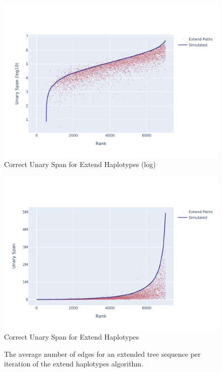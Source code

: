 \documentclass[10pt,twoside,lineno]{gsajnl}
\begin{document}
\begin{figure}[bht]
	\includegraphics[width=0.9\linewidth]{newplots_wo_ee/better_unary_spans_ep_log.pdf}
	\caption{Correct Unary Span for Extend Haplotypes (log)}
	\label{fig:correct-unary-span-log}
\end{figure}

\begin{figure}
	\includegraphics[width=0.9\linewidth]{newplots_wo_ee/better_unary_spans_ep_notlog.pdf}
	\caption{Correct Unary Span for Extend Haplotypes}
	\label{fig:correct-unary-span}
\end{figure}

\begin{figure}
	\caption{The average number of edges for an extended tree sequence per iteration of the extend haplotypes algorithm.}
	\label{fig:edges-per-iteration}
\end{figure}
\end{document}
